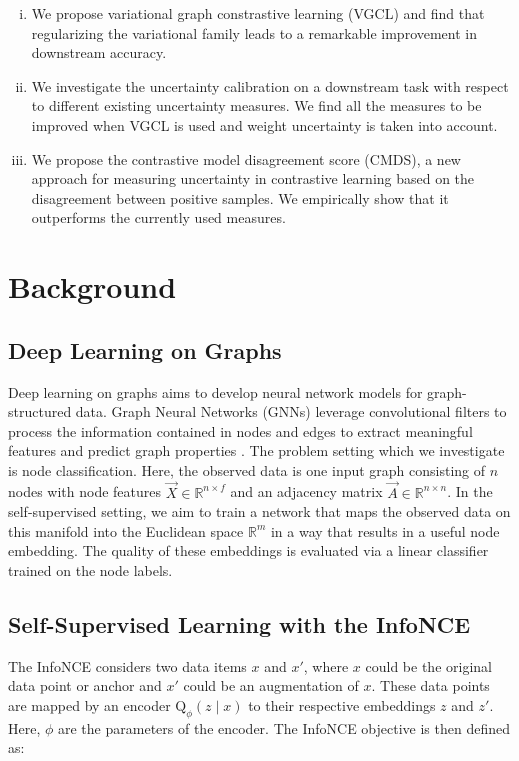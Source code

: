 \documentclass[tablecaption=bottom,wcp]{jmlr} %
\begin{document}
\begin{enumerate}[(i)]
  \item We propose variational graph constrastive learning (VGCL) and find that regularizing the variational family leads to a remarkable improvement in downstream accuracy. 
  \item We investigate the uncertainty calibration on a downstream task with respect to different existing uncertainty measures. We find all the measures to be improved when VGCL is used and weight uncertainty is taken into account.   
  \item We propose the contrastive model disagreement score (CMDS), a new approach for measuring uncertainty in contrastive learning based on the disagreement between positive samples.  We empirically show that it outperforms the currently used measures. 
\end{enumerate}


\section{Background}

\subsection{Deep Learning on Graphs}

Deep learning on graphs aims to develop neural network models for graph-structured data. Graph Neural Networks (GNNs) leverage convolutional filters to process the information contained in nodes and edges to extract meaningful features and predict graph properties \citep{gama2020graphs,wu2020survey}. The problem setting which we investigate is node classification. Here, the observed data is one input graph consisting of $n$ nodes with node features $\vec{X} \in \mathbb{R}^{n \times f}$ and an adjacency matrix $\vec{A} \in \mathbb{R}^{n \times n}$. In the self-supervised setting, we aim to train a network that maps the observed data on this manifold into the Euclidean space $\mathbb{R}^{m}$ in a way that results in a useful node embedding. The quality of these embeddings is evaluated via a linear classifier trained on the node labels. 


\subsection{Self-Supervised Learning with the InfoNCE}

The InfoNCE \citep{Oord2018} considers two data items $x$ and $x'$, where $x$ could be the original data point or anchor and $x'$ could be an augmentation of $x$. These data points are mapped by an encoder $\mathrm{Q}_\phi(z \mid x)$ to their respective embeddings $z$ and $z'$. Here, $\phi$  are the parameters of the encoder. The InfoNCE objective is then defined as:
\end{document}
